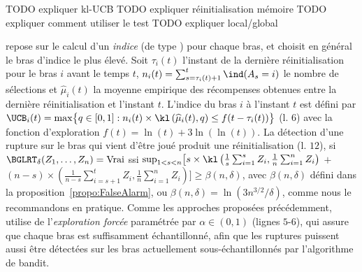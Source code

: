\documentclass[11pt,english,ignorenonframetext,]{beamer}
\begin{document}
\begin{frame}

  TODO expliquer kl-UCB
  TODO expliquer réinitialisation mémoire
  TODO expliquer comment utiliser le test
  TODO expliquer local/global

  \GLRklUCB{} repose sur le calcul d'un \emph{indice} (de type \klUCB{} \cite{KLUCBJournal}) pour chaque bras,  et choisit en général le bras d'indice le plus élevé. Soit
  $\tau_i(t)$ l'instant de la dernière réinitialisation pour le bras $i$ avant le temps $t$, $n_i(t) = \sum_{s=\tau_i(t)+1}^{t} \ind(A_s=i)$ le nombre de sélections et $\widehat{\mu}_i(t)$
  la moyenne empirique des récompenses obtenues entre la dernière réinitialisation et l'instant $t$. L'indice du bras $i$ à l'instant $t$ est défini par
  $\UCB_i(t) = \max \bigl\{ q\in[0,1] : n_i(t) \times \kl\left(\widehat{\mu}_i(t),q\right) \leq f(t - \tau_i(t)) \bigr\}$ (l. $6$) avec la fonction d'exploration $f(t) = \ln(t) + 3 \ln(\ln(t))$.
  La détection d'une rupture sur le bras qui vient d'être joué
  produit une réinitialisation (l. $12$),
  si $\BGLRT_\delta(Z_1,\dots,Z_n) = \mathrm{Vrai}$ ssi
  $\sup_{1 < s < n} \bigl[s \times \kl \left(\frac{1}{s}\sum_{i=1}^s Z_i, \frac{1}{n} \sum_{i=1}^n Z_i\right)$ $+$ $(n-s) \times (\frac{1}{n-s}\sum_{i=s+1}^t Z_i, \frac{1}{n}\sum_{i=1}^n Z_i) \bigr] \geq \beta(n,\delta)$,
  avec $\beta(n,\delta)$ défini dans la proposition~\ref{propo:FalseAlarm}, ou $\beta(n,\delta) = \ln(3n^{3/2}/\delta)$, comme nous le recommandons en pratique. Comme les approches proposées précédemment,
  \GLRklUCB{} utilise de l'\emph{exploration forcée}
  paramétrée par $\alpha\in(0,1)$
  (lignes $5$-$6$), qui assure que chaque bras est suffisamment échantillonné, afin que les ruptures puissent aussi être détectées sur les bras actuellement sous-échantillonnés par l'algorithme de bandit.

\end{frame}
\end{document}
